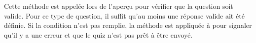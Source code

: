 \documentclass[a4paper,11pt,openany,oneside]{sphinxmanual}
\begin{document}
\begin{fulllineitems}

\begin{fulllineitems}
\label{front-end:SimpleQuestion.check_question}
Cette méthode est appelée lors de l'aperçu pour vérifier que la question
soit valide. Pour ce type de question, il suffit qu'au moins une réponse
valide ait été définie. Si la condition n'est pas remplie, la méthode
 est appliquée à  pour signaler qu'il y a une erreur
et que le quiz n'est pas prêt à être envoyé.

\end{fulllineitems}


\end{fulllineitems}

\end{document}
